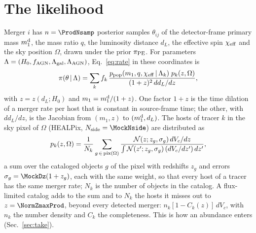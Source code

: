 \documentclass[aps,prd,reprint,superscriptaddress,nofootinbib]{revtex4-2}
\newcommand{\fagn}{f_{\rm AGN}}
\newcommand{\chieff}{\chi_{\rm eff}}
\begin{document}
\appendix

\section{The likelihood}
\label{app:like}

Merger $i$ has $n=\ProdNsamp$ posterior samples $\theta_{ij}$ of the detector-frame primary mass
$m_1^{\rm d}$, the mass ratio $q$, the luminosity distance $d_L$, the effective spin $\chieff$
and the sky position $\Omega$, drawn under the prior $\pi_{\rm PE}$. For parameters
$\Lambda=(H_0,\fagn,\Lambda_{\rm gal},\Lambda_{\rm AGN})$, Eq.~\eqref{eq:rate} in these
coordinates is
\begin{equation}
\pi(\theta\,|\,\Lambda)=\sum_k f_k\,
\frac{p_{\rm pop}(m_1,q,\chieff\,|\,\Lambda_k)\;p_k(z,\Omega)}{(1+z)^2\,dd_L/dz},
\label{eq:weight}
\end{equation}
with $z=z(d_L;H_0)$ and $m_1=m_1^{\rm d}/(1+z)$. One factor $1+z$ is the time dilation of a
merger rate per host that is constant in source-frame time; the other, with $dd_L/dz$, is the
Jacobian from $(m_1,z)$ to $(m_1^{\rm d},d_L)$. The hosts of tracer $k$ in the sky pixel of
$\Omega$ (HEALPix, $N_{\rm side}=\MockNside$) are distributed as
\begin{equation}
p_k(z,\Omega)=\frac{1}{N_k}\sum_{g\,\in\,{\rm pix}(\Omega)}
\frac{\mathcal{N}(z;z_g,\sigma_g)\,dV_c/dz}
{\int\mathcal{N}(z';z_g,\sigma_g)\,(dV_c/dz')\,dz'},
\label{eq:hosts}
\end{equation}
a sum over the cataloged objects $g$ of the pixel with redshifts $z_g$ and errors
$\sigma_g=\MockDz(1+z_g)$, each with the same weight, so that every host of a tracer has the
same merger rate; $N_k$ is the number of objects in the catalog. A flux-limited catalog adds to
the sum and to $N_k$ the hosts it misses out to $z=\NormZmaxProd$, beyond every detected merger:
$n_k[1-C_k(z)]\,dV_c$, with $n_k$ the number density and $C_k$ the completeness. This is how an
abundance enters (Sec.~\ref{sec:take}).
\end{document}
